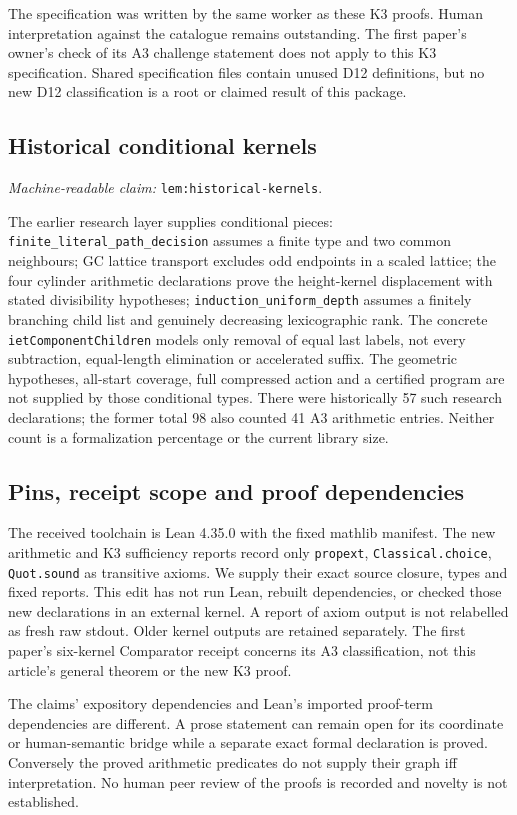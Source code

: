 \documentclass[11pt]{amsart}
\newcommand{\record}[1]{\nolinkurl{#1}}
\newcommand{\claimid}[1]{\par\nopagebreak\noindent\textit{Machine-readable claim:} \record{#1}.\par}
\theoremstyle{definition}\newtheorem{definition}{Definition}
\begin{document}
The specification was written by the same worker as these K3 proofs.
Human interpretation against the catalogue remains outstanding. The
first paper's owner's check of its A3 challenge statement does not
apply to this K3 specification. Shared specification files contain
unused D12 definitions, but no new D12 classification is a root or
claimed result of this package.

\subsection{Historical conditional kernels}\label{sec:historical-formal}
\label{lem:historical-kernels}\claimid{lem:historical-kernels}
The earlier research layer supplies conditional pieces:
\record{finite_literal_path_decision} assumes a finite type and two
common neighbours; GC lattice transport excludes odd endpoints in a
scaled lattice; the four cylinder arithmetic declarations prove the
height-kernel displacement with stated divisibility hypotheses;
\record{induction_uniform_depth} assumes a finitely branching child
list and genuinely decreasing lexicographic rank. The concrete
\record{ietComponentChildren} models only removal of equal last labels,
not every subtraction, equal-length elimination or accelerated suffix.
The geometric hypotheses, all-start coverage, full compressed action
and a certified program are not supplied by those conditional types.
There were historically 57 such research declarations; the former
total 98 also counted 41 A3 arithmetic entries. Neither count is a
formalization percentage or the current library size.

\subsection{Pins, receipt scope and proof dependencies}\label{sec:formal-records}
The received toolchain is Lean 4.35.0 with the fixed mathlib manifest.
The new arithmetic and K3 sufficiency reports record only
\record{propext}, \record{Classical.choice}, \record{Quot.sound} as
transitive axioms. We supply their exact source closure, types and
fixed reports. This edit has not run Lean, rebuilt dependencies,
or checked those new declarations in an external kernel. A report
of axiom output is not relabelled as fresh raw stdout. Older kernel
outputs are retained separately. The first paper's six-kernel
Comparator receipt concerns its A3 classification, not this article's
general theorem or the new K3 proof.

The claims' expository dependencies and Lean's imported proof-term
dependencies are different. A prose statement can remain open for
its coordinate or human-semantic bridge while a separate exact
formal declaration is proved. Conversely the proved arithmetic
predicates do not supply their graph iff interpretation. No human
peer review of the proofs is recorded and novelty is not established.
\end{document}
